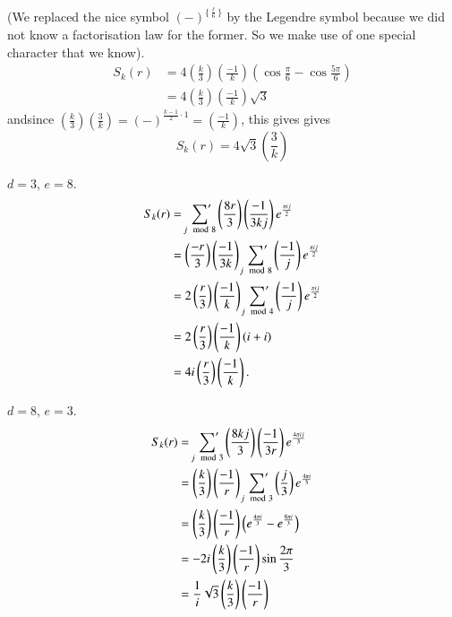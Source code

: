 (We replaced the nice symbol $(-)^{\{\frac{\ell}{6} \}}$ by the
  Legendre symbol because we did not know a factorisation law for the
  former. So we make use of one special character that we know). 
\begin{align*}
  S_k (r) & = 4 \left( \frac{k}{3}\right)\left(\frac{-1}{k} \right)
  \left(\cos \frac{\pi}{6} - \cos \frac{5 \pi}{6} \right)\\
  & = 4 \left( \frac{k}{3}\right) \left( \frac{-1}{k}\right) \sqrt{3} 
\end{align*}
and\pageoriginale since $\left( \frac{k}{3}\right) \left( \frac{3}{k}\right)=
(-)^{\frac{k-1}{2}\cdot 1} = \left( \frac{-1}{k}\right)$, this gives
gives
$$
S_k (r) = 4 \sqrt{3} \left( \frac{3}{k}\right)
$$

\begin{case}\label{part3:lec24:case2}
  $d=3$, $e=8$.
  \begin{align*}
  S_k (r) & = \sideset{}{'}\sum_{j \mod 8} \left( \frac{8r}{3}\right) \left(
  \frac{-1}{3kj}\right)  e^{\frac{\pi i j}{2}}\\
  & = \left( \frac{-r}{3}\right) \left( \frac{-1}{3k}\right)
  \sideset{}{'}\sum_{j 
    \mod 8} \left( \frac{-1}{j}\right) e^{\frac{\pi ij}{2}}\\
  & = 2 \left( \frac{r}{3}\right) \left( \frac{-1}{k}\right)
  \sideset{}{'}\sum_{j
    \mod 4} \left( \frac{-1}{j}\right) e^{\frac{\pi ij}{2}}\\
  & = 2 \left( \frac{r}{3}\right) \left( \frac{-1}{k}\right) (i+i)\\
  & = 4i \left( \frac{r}{3}\right) \left( \frac{-1}{k}\right).
  \end{align*}
\end{case}

\begin{case}\label{part3:lec24:case3}
  $d= 8$, $e=3$.
\begin{align*}
  S_k (r) & = \sideset{}{'}\sum_{j \mod 3} \left( \frac{8kj}{3}\right) \left(
  \frac{-1}{3r}\right) e^{\frac{4 \pi ij}{3}}\\
  & = \left( \frac{k}{3}\right) \left( \frac{-1}{r}\right)
  \sideset{}{'}\sum_{j
    \mod 3} \left( \frac{j}{3}\right) e^{\frac{4 \pi i}{3}}\\
  & = \left( \frac{k}{3}\right) \left( \frac{-1}{r}\right) \left(
  e^{\frac{4\pi i}{3}} - e^{\frac{8 \pi i}{3}}\right)\\
  & = -2 i \left( \frac{k}{3}\right) \left( \frac{-1}{r}\right) \sin
  \frac{2 \pi}{3}\\
  & = \frac{1}{i} \sqrt{3} \left( \frac{k}{3}\right) \left(
  \frac{-1}{r} \right)
\end{align*}
\end{case}\pageoriginale

